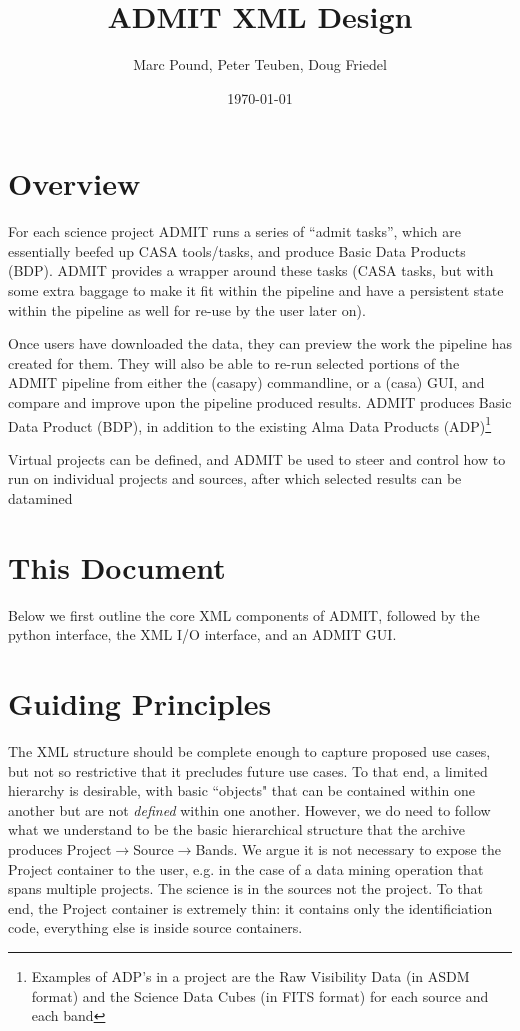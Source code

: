 \documentclass{article}
\title{ADMIT XML Design}
\author{Marc Pound, Peter Teuben, Doug Friedel}
\date{\today}
\begin{document}
\maketitle

\section{Overview}

For each science project ADMIT runs a series of ``admit tasks'', which
are essentially beefed up CASA tools/tasks, and produce Basic Data
Products (BDP).  ADMIT provides a wrapper around these tasks
(CASA tasks, but with some extra baggage to make it fit within the pipeline
and have a persistent state within the pipeline as well for re-use by
the user later on).

Once users have downloaded the data, they can preview the work the pipeline
has created for them. They will also be able to re-run
selected portions of the ADMIT pipeline from either the (casapy)
commandline, or a (casa) GUI, and compare and improve upon the
pipeline produced results. ADMIT produces Basic Data Product (BDP), in
addition to the existing Alma Data Products (ADP)\footnote{Examples of
ADP's in a project are the Raw Visibility Data (in ASDM format) and
the Science Data Cubes (in FITS format) for each source and each
band}

Virtual projects can be defined, and ADMIT be used to steer and control
how to run on individual projects and sources, after which selected
results can be datamined 

\section{This Document}

Below we first outline the core XML components of ADMIT, followed by
the python interface, the XML I/O interface, and an ADMIT GUI.

\section{Guiding Principles}
The XML structure should be complete enough to capture proposed use cases,
but not so restrictive that it precludes future use cases. To that end, a
limited hierarchy is desirable, with basic ``objects" that can be contained
within one another but are not {\it defined} within one another.  However, we
do need to follow what we understand to be the basic hierarchical structure
that the archive produces Project$\rightarrow$Source$\rightarrow$Bands.
We argue it is not necessary to expose the Project container to
the user, e.g. in the case of a data mining operation that spans multiple
projects. The science is in the sources not the project. To that end, the
Project container is extremely thin: it contains only the identificiation
code, everything else is inside source containers.
\end{document}
